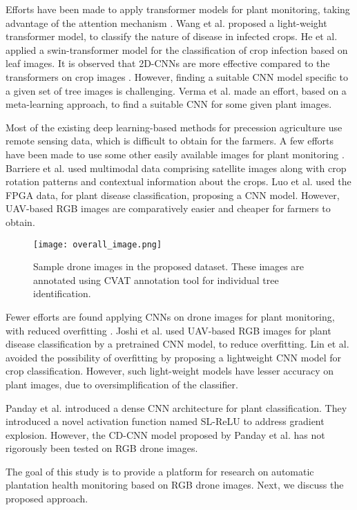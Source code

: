 Efforts have been made to apply transformer models for plant monitoring, taking advantage of the attention mechanism \cite{trans1,trans2}. Wang et al. \cite{trans1} proposed a light-weight transformer model, to classify the nature of disease in infected crops. He et al. \cite{trans2} applied a swin-transformer model for the classification of crop infection based on leaf images. It is observed that 2D-CNNs are more effective compared to the transformers on crop images \cite{c10}. However, finding a suitable CNN model specific to a given set of tree images is challenging. Verma et al. \cite{verma_cea} made an effort, based on a meta-learning approach, to find a suitable CNN for some given plant images.

Most of the existing deep learning-based methods for precession agriculture use remote sensing data, which is difficult to obtain for the farmers. A few efforts have been made to use some other easily available images for plant monitoring \cite{rse24,cea1}. Barriere et al. \cite{rse24} used multimodal data comprising satellite images along with crop rotation patterns and contextual information about the crops. Luo et al. \cite{cea1} used the FPGA data, for plant disease classification, proposing a CNN model. However, UAV-based RGB images are comparatively easier and cheaper for farmers to obtain.
\begin{figure}[!ht]
\centering
\texttt{[image: overall\_image.png]}
\caption{Sample drone images in the proposed dataset. These images are annotated using CVAT annotation tool for individual tree identification.}
\label{overall}
\end{figure}

Fewer efforts are found applying CNNs on drone images for plant monitoring, with reduced overfitting \cite{rgb1,trans2}. Joshi et al. \cite{rgb1} used UAV-based RGB images for plant disease classification by a pretrained CNN model, to reduce overfitting. Lin et al. \cite{light} avoided the possibility of overfitting by proposing a lightweight CNN model for crop classification. However, such light-weight models have lesser accuracy on plant images, due to oversimplification of the classifier.

Panday et al. \cite{c10} introduced a dense CNN architecture for plant classification. They introduced a novel activation function named SL-ReLU to address gradient explosion. However, the CD-CNN model proposed by Panday et al. \cite{c10} has not rigorously been tested on RGB drone images.

The goal of this study is to provide a platform for research on automatic plantation health monitoring based on RGB drone images. Next, we discuss the proposed approach.